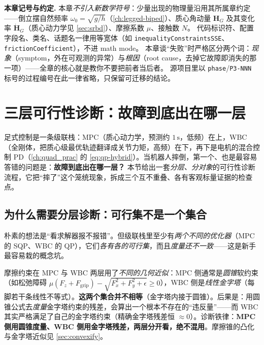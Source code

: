 \begin{note}
\textbf{本章记号与约定.}\;
本章\emph{不引入新数学符号}：少量出现的物理量沿用其所属章约定——倒立摆自然频率 $\omega_0=\sqrt{g/h}$（\cref{ch:legged-biped}）、质心角动量 $\boldsymbol H_G$ 及其变化率 $\dot{\boldsymbol H}_G$（质心动力学见 \cref{sec:srbd}）、摩擦系数 $\mu$、接触数 $N$。
代码标识符、配置字段名、类名、话题名一律用等宽体（如 \texttt{inequalityConstraintsSSE}、\texttt{frictionCoefficient}），不进 math mode。
本章谈“失败”时严格区分两个词：\emph{现象}（symptom，外在可观测的异常）与\emph{根因}（root cause，去掉它故障即消失的那一项）——全章的核心就是教你不要把前者当后者。
源项目里以 \texttt{phase}/\texttt{P3-NNN} 标号的过程编号在此一律省略，只保留可迁移的结论。
\end{note}

\section{三层可行性诊断：故障到底出在哪一层}
\label{sec:ld-three-layer}

足式控制是一条级联栈：MPC（质心动力学，预测约 $1\,\mathrm{s}$，低频）在上，WBC（全刚体，把质心级最优轨迹翻译成关节力矩，高频）在下，再下是电机的混合控制 PD（\cref{ch:quad_prac} 的 \cref{eq:qp-hybrid}）。当机器人摔倒，第一个、也是最容易答错的问题是：\textbf{故障到底出在哪一层？} 本节给出一套\emph{分层、分对象}的可行性诊断流程，它把“摔了”这个笼统现象，拆成三个互不重叠、各有客观标量证据的检查点。

\subsection{为什么需要分层诊断：可行集不是一个集合}
\label{subsec:ld-why-layer}

朴素的想法是“看求解器报不报错”。但级联栈里至少有\emph{两个不同的优化器}（MPC 的 SQP、WBC 的 QP），它们\emph{各有各的可行集}，而且\emph{度量还不一致}——这是新手最容易栽的概念坑。

\begin{insight}\label{ins:ld-pyramid-cone}
摩擦约束在 MPC 与 WBC 两层用了\emph{不同的几何近似}：MPC 侧通常是\emph{圆锥}软约束（如松弛障碍 $\mu(F_z+F_{\mathrm{grip}})-\sqrt{F_x^2+F_y^2+\epsilon}\ge 0$），WBC 侧是\emph{线性金字塔}（每脚若干条线性不等式）。\textbf{这两个集合并不相等}（金字塔内接于圆锥）。后果是：用圆锥公式去\emph{度量}金字塔约束的残差，会算出一个根本不存在的“违反量”——而 WBC 其实严格满足了自己的金字塔约束（精确金字塔残差恒 $\approx 0$）。诊断铁律：\textbf{MPC 侧用圆锥度量、WBC 侧用金字塔残差，两层分开看，绝不混用}。摩擦锥的凸化与金字塔近似见 \cref{sec:convexify}。
\end{insight}

